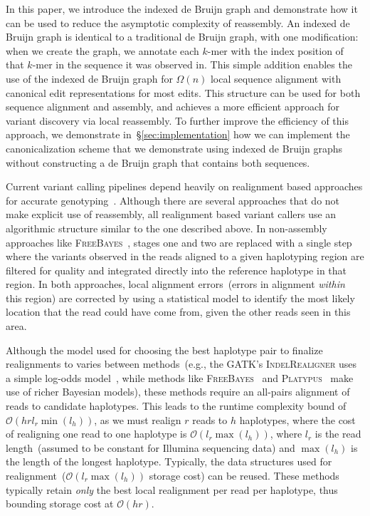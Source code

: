 \documentclass{bioinfo}
\begin{document}
In this paper, we introduce the indexed de Bruijn graph and demonstrate how it can be used to
reduce the asymptotic complexity of reassembly. An indexed de Bruijn graph is identical to a
traditional de Bruijn graph, with one modification: when we create the graph, we annotate each
$k$-mer with the index position of that $k$-mer in the sequence it was observed in. This simple addition
enables the use of the indexed de Bruijn graph for $\Omega(n)$ local sequence alignment with
canonical edit representations for most edits. This structure can be used for both sequence alignment and
assembly, and achieves a more efficient approach for variant discovery via local reassembly.
To further improve the efficiency of this approach, we demonstrate in~\S\ref{sec:implementation}
how we can implement the canonicalization scheme that we demonstrate using indexed de Bruijn
graphs without constructing a de Bruijn graph that contains both sequences.

Current variant calling pipelines depend heavily on realignment based approaches for accurate
genotyping~\citep{li14}. Although there are several approaches that do not make explicit use of reassembly,
all realignment based variant callers use an algorithmic structure similar to the one described
above. In non-assembly approaches like \textsc{FreeBayes}~\citep{garrison12}, stages
one and two are replaced with a single step where the variants observed in the reads aligned to a given
haplotyping region are filtered for quality and integrated directly into the reference haplotype in that region.
In both approaches, local alignment errors~(errors in alignment \emph{within} this region) are corrected
by using a statistical model to identify the most likely location that the read could have come from, given
the other reads seen in this area.

Although the model used for choosing the best haplotype pair to finalize realignments to varies between
methods~(e.g., the GATK's \textsc{IndelRealigner} uses a simple log-odds model~\citep{depristo11}, while
methods like \textsc{FreeBayes}~\citep{garrison12} and \textsc{Platypus}~\citep{rimmer14} make use of richer
Bayesian models), these methods require an all-pairs alignment of reads to candidate
haplotypes. This leads to the runtime complexity bound of $\mathcal{O}(h r l_r \min(l_h))$,
as we must realign $r$ reads to $h$ haplotypes, where the cost of realigning
one read to one haplotype is $\mathcal{O}(l_r \max(l_h))$, where $l_r$ is the read length~(assumed to be
constant for Illumina sequencing data) and $\max(l_h)$ is the length of the longest haplotype. Typically,
the data structures used for realignment~($\mathcal{O}(l_r \max(l_h))$ storage cost) can be reused.
These methods typically retain \emph{only} the best local realignment per read per haplotype, thus
bounding storage cost at $\mathcal{O}(h r)$.
\end{document}
